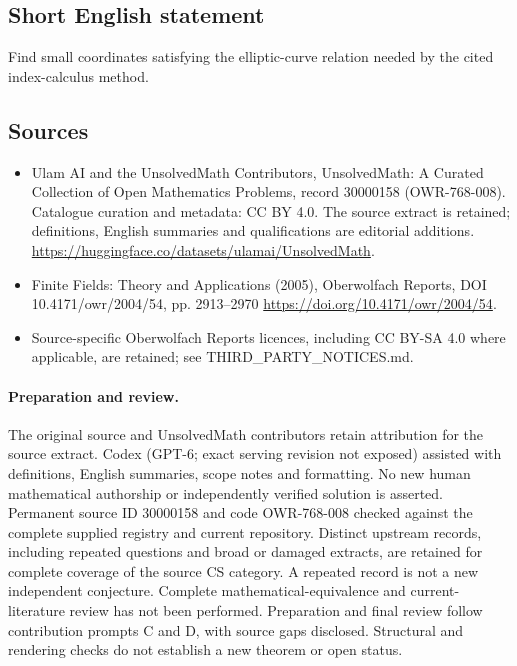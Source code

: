 \documentclass[11pt]{article}
\begin{document}
\subsection{Short English statement}
Find small coordinates satisfying the elliptic-curve relation needed by the cited index-calculus method.
\subsection{Sources}
\begin{itemize}
\item[\hypertarget{source:30000158:1}{S1}] Ulam AI and the UnsolvedMath Contributors, UnsolvedMath: A Curated Collection of Open Mathematics Problems, record 30000158 (OWR-768-008). Catalogue curation and metadata: CC BY 4.0. The source extract is retained; definitions, English summaries and qualifications are editorial additions.
\url{https://huggingface.co/datasets/ulamai/UnsolvedMath}.
\item[\hypertarget{source:30000158:2}{S2}] Finite Fields: Theory and Applications (2005), Oberwolfach Reports, DOI 10.4171/owr/2004/54, pp. 2913--2970
\url{https://doi.org/10.4171/owr/2004/54}.
\item Source-specific Oberwolfach Reports licences, including CC BY-SA 4.0 where applicable, are retained; see THIRD\_PARTY\_NOTICES.md.
\end{itemize}
\paragraph{Preparation and review.}
The original source and UnsolvedMath contributors retain attribution for the source extract. Codex (GPT-6; exact serving revision not exposed) assisted with definitions, English summaries, scope notes and formatting. No new human mathematical authorship or independently verified solution is asserted. Permanent source ID 30000158 and code OWR-768-008 checked against the complete supplied registry and current repository. Distinct upstream records, including repeated questions and broad or damaged extracts, are retained for complete coverage of the source CS category. A repeated record is not a new independent conjecture. Complete mathematical-equivalence and current-literature review has not been performed. Preparation and final review follow contribution prompts C and D, with source gaps disclosed. Structural and rendering checks do not establish a new theorem or open status.
\label{end:30000158}
\end{document}
